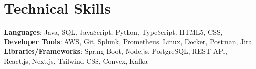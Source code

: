 \documentclass[letterpaper,11pt]{article}
\begin{document}
\section{Technical Skills}
\begin{itemize}[leftmargin=0.15in, label={}]
  \small{\item{   
    \textbf{Languages}: Java, SQL, JavaScript, Python, TypeScript, HTML5, CSS,  \\[1mm]
    \textbf{Developer Tools}: AWS, Git, Splunk, Prometheus, Linux, Docker, Postman, Jira \\[1mm]
    \textbf{Libraries/Frameworks}: Spring Boot, Node.js, PostgreSQL, REST API, React.js, Next.js, Tailwind CSS, Convex, Kafka \\[1mm]
  }}
\end{itemize}
\vspace{-16pt}
\vspace{3pt}
\vspace{10pt}

\vspace{-15pt}
\end{document}
